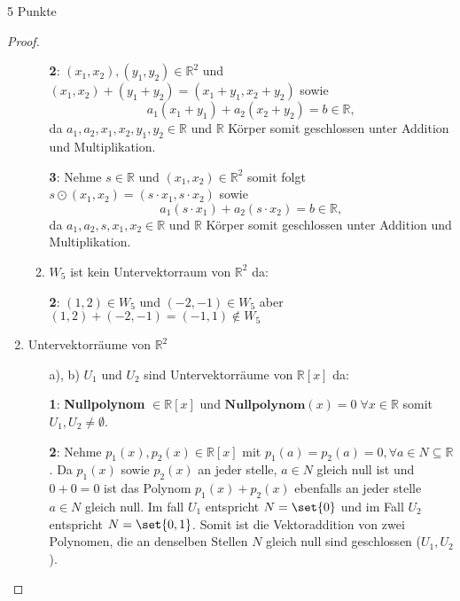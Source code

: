\documentclass{problemset}
\begin{document}
\begin{problem}{5 Punkte}
\begin{proof}
\begin{enumerate}
\begin{enumerate}[label=\alph*)]
                        \textbf{2}: $(x_1, x_2), (y_1, y_2) \in \mathbb{R}^2$ und $(x_1, x_2) + (y_1+y_2) = (x_1 + y_1, x_2 + y_2)$ sowie \[
                            a_1(x_1+y_1) + a_2(x_2+y_2) = b \in \mathbb{R},
                        \] da $a_1,a_2,x_1,x_2,y_1,y_2 \in \mathbb{R}$ und
                           $\mathbb{R}$ Körper somit geschlossen unter Addition
                           und Multiplikation.

                        \textbf{3}: Nehme $s \in \mathbb{R}$ und $(x_1, x_2) \in \mathbb{R}^2$ somit folgt $s \odot (x_1, x_2) = (s \cdot x_1, s \cdot x_2)$ sowie \[
                            a_1(s \cdot x_1) + a_2(s \cdot x_2) = b \in \mathbb{R},
                        \] da $a_1,a_2, s,x_1,x_2 \in \mathbb{R}$ und
                           $\mathbb{R}$ Körper somit geschlossen unter Addition
                           und Multiplikation.
                  \item $W_5$ ist kein Untervektorraum von $\mathbb{R}^2$ da:

                        \textbf{2}: $(1, 2) \in W_5$ und $(-2, -1) \in W_5$ aber $(1, 2) + (-2, -1) = (-1, 1) \not\in W_5$
              \end{enumerate}
        \item Untervektorräume von $\mathbb{R}^2$

              \begin{enumerate}
                  \item [a), b)] $U_1$ und $U_2$ sind Untervektorräume von $\mathbb{R}[x]$ da:

                        \textbf{1}: \textbf{Nullpolynom} $\in \mathbb{R}[x]$ und $\textbf{Nullpolynom}(x) = 0 \; \forall x \in \mathbb{R}$ somit $U_1, U_2 \neq \emptyset$. \checkmark

                        \textbf{2}: Nehme $p_1(x), p_2(x) \in \mathbb{R}[x]$ mit $p_1(a) = p_2(a) = 0, \forall a \in N \subseteq \mathbb{R}$.
                        Da $p_1(x)$ sowie $p_2(x)$ an jeder stelle, $a \in N$ gleich null ist und $0 + 0 = 0$ ist das Polynom $p_1(x) + p_2(x)$ ebenfalls an jeder stelle $a \in N$ gleich null.
                        Im fall $U_1$ entspricht $N = \set{0}$ und im Fall $U_2$ entspricht $N = \set{0, 1}$.
                        Somit ist die Vektoraddition von zwei Polynomen, die an denselben Stellen $N$ gleich null sind geschlossen ($U_1, U_2$). \checkmark


\end{enumerate}
\end{enumerate}
\end{proof}
\end{problem}
\end{document}
